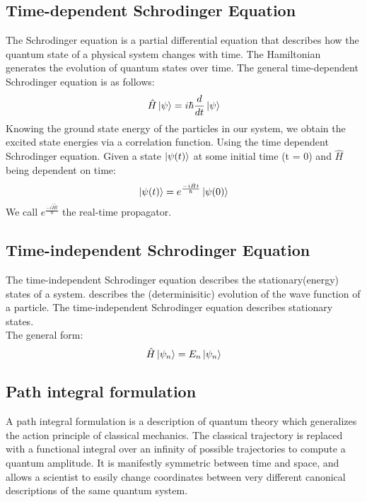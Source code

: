 \documentclass[12pt,letterpaper,oneside,final,titlepage]{article}               %
\numberwithin{equation}{section} %
\newcommand{\emiHt}{e^{\frac{-i\hat{H}t}{\hbar}}}
\begin{document}
\subsection{Time-dependent Schrodinger Equation}
The Schrodinger equation is a partial differential equation that describes how the quantum state of a physical system changes with time. 
The Hamiltonian generates the evolution of quantum states over time. 
The general time-dependent Schrodinger equation is as follows:
\begin{equation}
    \hat{H}\ket{\psi} = i\hbar\frac{d}{dt}\ket{\psi}
\end{equation}
Knowing the ground state energy of the particles in our system, we obtain the excited state energies via a correlation function.
Using the time dependent Schrodinger equation.
Given a state $\ket{\psi(t)}$ at some initial time (t = 0) and $\hat{H}$ being dependent on time:
\begin{equation}
    \ket{\psi(t)} = \emiHt\ket{\psi(0)}
\end{equation}
We call $\emiHt$ the real-time propagator.


\subsection{Time-independent Schrodinger Equation}
The time-independent Schrodinger equation describes the stationary(energy) states of a system. 
describes the (determinisitic) evolution of the wave function of a particle.
The time-independent Schrodinger equation describes stationary states. \\
The general form:
\begin{equation}
    \hat{H}\ket{\psi_{n}} = E_{n}\ket{\psi_{n}}
\end{equation}


\subsection{Path integral formulation}
A path integral formulation is a description of quantum theory which generalizes the action principle of classical mechanics.
The classical trajectory is replaced with a functional integral over an infinity of possible trajectories to compute a quantum amplitude.
It is manifestly symmetric between time and space, and allows a scientist to easily change coordinates between very different canonical descriptions of the same quantum system. 
\end{document}
